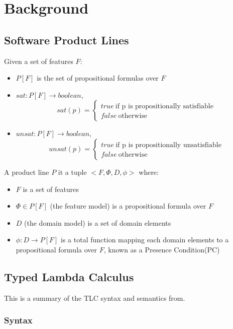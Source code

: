 \documentclass[10pt,conference]{IEEEtran}
\begin{document}
\section{Background}

\subsection{Software Product Lines}

Given a set of features $F$:
\begin{itemize}
	\item $P[F]$ is the set of propositional formulas over $F$
	\item $sat:P[F] \to boolean$, \[ sat(p) = \begin{cases}
			true\ \text{if p is propositionally satisfiable} \\
			false\ \text{otherwise}
		\end{cases} \]
	\item $unsat:P[F] \to boolean$, \[ unsat(p) = \begin{cases}
			true\ \text{if p is propositionally unsatisfiable} \\
			false\ \text{otherwise}
		\end{cases} \]

\end{itemize}

A product line $P$ it a tuple $<F,\Phi,D,\phi>$ where:
\begin{itemize}
	\item $F$ is a set of features
	\item $\Phi \in P[F]$ (the feature model) is a propositional formula over $F$
	\item $D$ (the domain model) is a set of domain elements
	\item $\phi : D \to P[F]$ is a total function mapping each domain elements to a propositional formula over $F$, known as a Presence Condition(PC)
\end{itemize}

\subsection{Typed Lambda Calculus}

This is a summary of the TLC syntax and semantics from\cite{Pierce2002}.

\subsubsection{Syntax}
\end{document}
